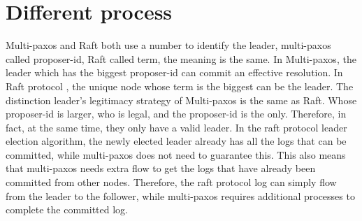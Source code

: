\documentclass{report}
\begin{document}
\section{Different process}
Multi-paxos and Raft both use a number to identify the leader, multi-paxos called proposer-id, Raft called term, the meaning is the same. In Multi-paxos, the leader which has the biggest proposer-id can commit an effective resolution. In Raft protocol ,  the unique node whose term is the biggest can be the leader. The distinction leader’s legitimacy strategy of Multi-paxos is the same as Raft. Whose proposer-id is larger, who is legal, and the proposer-id is the only. Therefore, in fact, at the same time, they only have a valid leader. In the raft protocol leader election algorithm, the newly elected leader already has all the logs that can be committed, while multi-paxos does not need to guarantee this. This also means that multi-paxos needs extra flow to get the logs that have already been committed from other nodes. Therefore, the raft protocol log can simply flow from the leader to the follower, while multi-paxos requires additional processes to complete the committed log.
\end{document}
